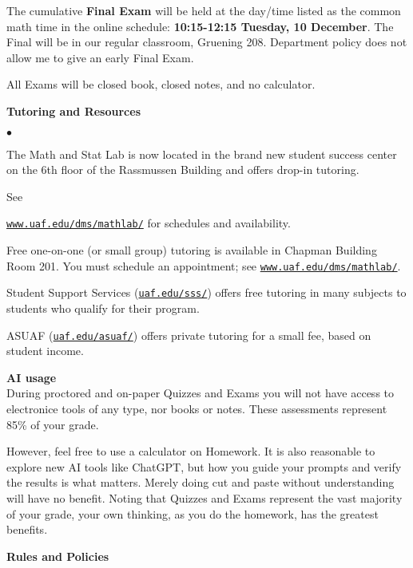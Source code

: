 \documentclass[12pt]{article}
\renewcommand{\emph}[1]{\textsf{\textbf{#1}}}
\newcommand{\localhead}[1]{\par\smallskip\textbf{#1} \smallskip\nobreak\\}%
\def\heading#1{\localhead{\large\emph{#1}}}
\newenvironment{clist}%
{\bgroup\parskip 0pt\begin{list}{$\bullet$}{\partopsep 4pt\topsep 0pt\itemsep -2pt}}%
{\end{list}\egroup}%
\begin{document}
The cumulative \emph{Final Exam} will be held at the day/time listed
as the common math time in the online schedule: \emph{10:15-12:15
Tuesday, 10 December}.  The Final will be in our regular classroom,
Gruening 208.  Department policy does not allow me to give an early
Final Exam.

All Exams will be closed book, closed notes, and no calculator.

\newpage

\heading{Tutoring and Resources}
\vskip -30pt\strut
\begin{clist}
    \item The Math and Stat Lab is now located in the brand new
      student success center on the 6th floor of the Rassmussen Building and
      offers drop-in tutoring.

	See 

	\href{http://www.uaf.edu/dms/mathlab/}{\texttt{www.uaf.edu/dms/mathlab/}} for schedules and availability.
	\item Free
one-on-one (or small group) tutoring is available in 
Chapman Building Room 201. You must schedule an
appointment; see \href{http://www.uaf.edu/dms/mathlab/}{\texttt{www.uaf.edu/dms/mathlab/}}.
	\item Student Support Services (\href{https://uaf.edu/sss/}{\texttt{uaf.edu/sss/}}) offers free tutoring in many subjects to students who qualify for their program.
	\item ASUAF (\href{https://uaf.edu/asuaf/}{\texttt{uaf.edu/asuaf/}}) offers private tutoring for a small fee, based on student income.
\end{clist}


\clearpage\newpage

\strut

\vspace{-12pt}

\heading{AI usage}
During proctored and on-paper Quizzes and Exams you will not have access to electronice tools of any type, nor books or notes.  These assessments represent 85\% of your grade.

However, feel free to use a calculator on Homework.  It is also reasonable to explore new AI tools like ChatGPT, but how you guide your prompts and verify the results is what matters.  Merely doing cut and paste without understanding will have no benefit.  Noting that Quizzes and Exams represent the vast majority of your grade, your own thinking, as you do the homework, has the greatest benefits.


\heading{Rules and Policies}
\vskip -20pt
\end{document}
